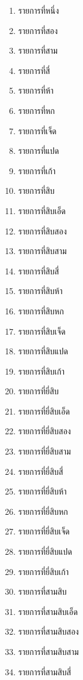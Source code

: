 \documentclass[11pt]{ltxguide}
\begin{document}
\begin{multicols}{4}
    \scriptsize
    \begin{enumerate}[listparindent=0pc,topsep=0pc,itemsep=0pc,label={\thaimultialph*.}]
        \item  รายการที่หนึ่ง
        \item  รายการที่สอง
        \item  รายการที่สาม
        \item  รายการที่สี่
        \item  รายการที่ห้า
        \item  รายการที่หก
        \item  รายการที่เจ็ด
        \item  รายการที่แปด
        \item  รายการที่เก้า
        \item  รายการที่สิบ
        \item  รายการที่สิบเอ็ด
        \item  รายการที่สิบสอง
        \item  รายการที่สิบสาม
        \item  รายการที่สิบสี่
        \item  รายการที่สิบห้า
        \item  รายการที่สิบหก
        \item  รายการที่สิบเจ็ด
        \item  รายการที่สิบแปด
        \item  รายการที่สิบเก้า
        \item  รายการที่ยี่สิบ
        \item  รายการที่ยี่สิบเอ็ด
        \item  รายการที่ยี่สิบสอง
        \item  รายการที่ยี่สิบสาม
        \item  รายการที่ยี่สิบสี่
        \item  รายการที่ยี่สิบห้า
        \item  รายการที่ยี่สิบหก
        \item  รายการที่ยี่สิบเจ็ด
        \item  รายการที่ยี่สิบแปด
        \item  รายการที่ยี่สิบเก้า
        \item  รายการที่สามสิบ
        \item  รายการที่สามสิบเอ็ด
        \item  รายการที่สามสิบสอง
        \item  รายการที่สามสิบสาม
        \item  รายการที่สามสิบสี่

\end{enumerate}
\end{multicols}
\end{document}
